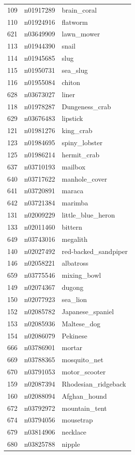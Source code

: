 \begin{table}
\begin{tabular}{cll}
109 & n01917289 & brain_coral \\
110 & n01924916 & flatworm \\
621 & n03649909 & lawn_mower \\
113 & n01944390 & snail \\
114 & n01945685 & slug \\
115 & n01950731 & sea_slug \\
116 & n01955084 & chiton \\
628 & n03673027 & liner \\
118 & n01978287 & Dungeness_crab \\
629 & n03676483 & lipstick \\
121 & n01981276 & king_crab \\
123 & n01984695 & spiny_lobster \\
125 & n01986214 & hermit_crab \\
637 & n03710193 & mailbox \\
640 & n03717622 & manhole_cover \\
641 & n03720891 & maraca \\
642 & n03721384 & marimba \\
131 & n02009229 & little_blue_heron \\
133 & n02011460 & bittern \\
649 & n03743016 & megalith \\
140 & n02027492 & red-backed_sandpiper \\
146 & n02058221 & albatross \\
659 & n03775546 & mixing_bowl \\
149 & n02074367 & dugong \\
150 & n02077923 & sea_lion \\
152 & n02085782 & Japanese_spaniel \\
153 & n02085936 & Maltese_dog \\
154 & n02086079 & Pekinese \\
666 & n03786901 & mortar \\
669 & n03788365 & mosquito_net \\
670 & n03791053 & motor_scooter \\
159 & n02087394 & Rhodesian_ridgeback \\
160 & n02088094 & Afghan_hound \\
672 & n03792972 & mountain_tent \\
674 & n03794056 & mousetrap \\
679 & n03814906 & necklace \\
680 & n03825788 & nipple \\

\end{tabular}
\end{table}
